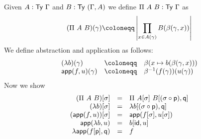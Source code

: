 Given \(A : \mathsf{Ty}\ \Gamma\) and \(B : \mathsf{Ty}\ (\Gamma, A)\) we define
\(\Pi\ A\ B : \mathsf{Ty}\ \Gamma\) as
\[
  (\Pi\ A\ B)(\gamma) \coloneqq \card{\prod_{x \in A(\gamma)} B(\beta(\gamma,x))}
\]
We define abstraction and application as follows:
\[
  \begin{array}{lcl}
    (\lambda b)(\gamma) &\coloneqq& \beta(x \mapsto b(\beta(\gamma,x))) \\
    \capp(f,u)(\gamma) &\coloneqq& \beta^{-1}(f(\gamma))(u(\gamma))
  \end{array}
\]
Now we show
\[
  \begin{array}{rcl}
    (\Pi\ A\ B)[\sigma] &=& \Pi\ A[\sigma]\ B[(\sigma \circ \mathsf{p}), \mathsf{q}] \\
    (\lambda b)[\sigma] &=& \lambda b[(\sigma \circ \mathsf{p}), \mathsf{q}] \\
    (\mathsf{app}(f,u))[\sigma] &=& \mathsf{app}(f[\sigma],u[\sigma]) \\
    \mathsf{app}(\lambda b, u) &=& b[\mathsf{id}, u] \\
    \lambda \mathsf{app}(f[\mathsf{p}], \mathsf{q}) &=& f
  \end{array}
\]

